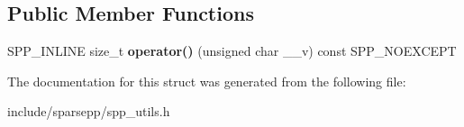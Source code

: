 \subsection*{Public Member Functions}
\begin{DoxyCompactItemize}
\item 
S\+P\+P\+\_\+\+I\+N\+L\+I\+NE size\+\_\+t {\bfseries operator()} (unsigned char \+\_\+\+\_\+v) const S\+P\+P\+\_\+\+N\+O\+E\+X\+C\+E\+PT\hypertarget{structspp___1_1spp__hash_3_01unsigned_01char_01_4_ad7ac82a7a44676a13cf22cff5201ac98}{}\label{structspp___1_1spp__hash_3_01unsigned_01char_01_4_ad7ac82a7a44676a13cf22cff5201ac98}

\end{DoxyCompactItemize}


The documentation for this struct was generated from the following file\+:\begin{DoxyCompactItemize}
\item 
include/sparsepp/spp\+\_\+utils.\+h\end{DoxyCompactItemize}
